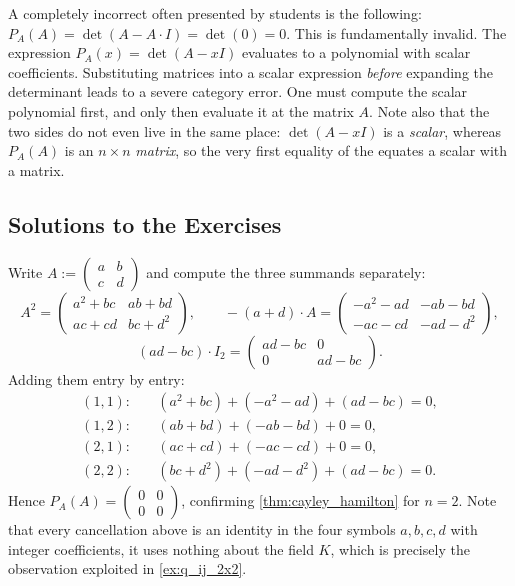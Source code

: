 \begin{remark}\label{rem:lazy_proof}
  A completely incorrect  often presented by students is the following: $P_A(A) = \det(A - A \cdot I) = \det(0) = 0$. This is fundamentally invalid. The expression $P_A(x) = \det(A - xI)$ evaluates to a polynomial with scalar coefficients. Substituting matrices into a scalar expression \textit{before} expanding the determinant leads to a severe category error. One must compute the scalar polynomial first, and only then evaluate it at the matrix $A$.
  Note also that the two sides do not even live in the same place: $\det(A - x I)$ is a \emph{scalar}, whereas $P_A(A)$ is an $n \times n$ \emph{matrix}, so the very first equality of the  equates a scalar with a matrix.
\end{remark}

\subsection{Solutions to the Exercises}
\label{sec:solutions_minimal_poly}

\begin{exercisesolution}
\label{sol:cayley_2x2}
  Write $A := \left(\begin{smallmatrix} a & b \\ c & d \end{smallmatrix}\right)$ and compute the three summands separately:
  \[ A^2 = \begin{pmatrix} a^2 + bc & ab + bd \\ ac + cd & bc + d^2 \end{pmatrix}, \qquad
     -(a+d) \cdot A = \begin{pmatrix} -a^2 - ad & -ab - bd \\ -ac - cd & -ad - d^2 \end{pmatrix}, \]
  \[ (ad - bc) \cdot I_2 = \begin{pmatrix} ad - bc & 0 \\ 0 & ad - bc \end{pmatrix}. \]
  Adding them entry by entry:
  \begin{align*}
    (1,1): &\quad (a^2 + bc) + (-a^2 - ad) + (ad - bc) = 0, \\
    (1,2): &\quad (ab + bd) + (-ab - bd) + 0 = 0, \\
    (2,1): &\quad (ac + cd) + (-ac - cd) + 0 = 0, \\
    (2,2): &\quad (bc + d^2) + (-ad - d^2) + (ad - bc) = 0.
  \end{align*}
  Hence $P_A(A) = \left(\begin{smallmatrix} 0 & 0 \\ 0 & 0 \end{smallmatrix}\right)$, confirming \cref{thm:cayley_hamilton} for $n = 2$. Note that every cancellation above is an identity in the four symbols $a, b, c, d$ with integer coefficients, it uses nothing about the field $K$, which is precisely the observation exploited in \cref{ex:q_ij_2x2}.
\end{exercisesolution}

